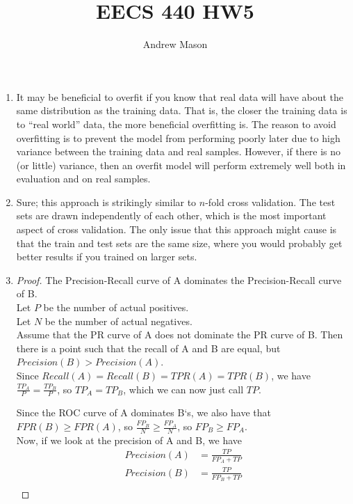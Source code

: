 \documentclass[12pt]{article}
\title{EECS 440 HW5}
\author{Andrew Mason}
\begin{document}
\maketitle

\begin{enumerate}
  \item
    It may be beneficial to overfit if you know that real data will have about
    the same distribution as the training data. That is, the closer the
    training data is to ``real world'' data, the more beneficial overfitting
    is. The reason to avoid overfitting is to prevent the model from performing
    poorly later due to high variance between the training data and real
    samples. However, if there is no (or little) variance, then an overfit
    model will perform extremely well both in evaluation and on real samples.\\
  \item
    Sure; this approach is strikingly similar to $n$-fold cross validation. The
    test sets are drawn independently of each other, which is the most important
    aspect of cross validation. The only issue that this approach might cause is
    that the train and test sets are the same size, where you would probably get
    better results if you trained on larger sets.\\
  \item
    \begin{proof} The Precision-Recall curve of A dominates the
      Precision-Recall curve of B.\\
      Let $P$ be the number of actual positives.\\
      Let $N$ be the number of actual negatives.\\

      Assume that the PR curve of A does not dominate the PR curve of B. Then
      there is a point such that the recall of A and B are equal, but
      $Precision(B)>Precision(A)$.\\

      Since $Recall(A)=Recall(B)=TPR(A)=TPR(B)$, we have
      $\frac{TP_A}{P}=\frac{TP_B}{P}$, so $TP_A=TP_B$, which we can now just
      call $TP$.

      Since the ROC curve of A dominates B`s, we also have that $FPR(B)\geq
      FPR(A)$, so $\frac{FP_B}{N}\geq\frac{FP_A}{N}$, so $FP_B\geq FP_A$.\\

      Now, if we look at the precision of A and B, we have
      \begin{equation}
        \begin{split}
          Precision(A)&=\frac{TP}{FP_A+TP}\\
          Precision(B)&=\frac{TP}{FP_B+TP}\\
        \end{split}
      \end{equation}


\end{proof}
\end{enumerate}
\end{document}
